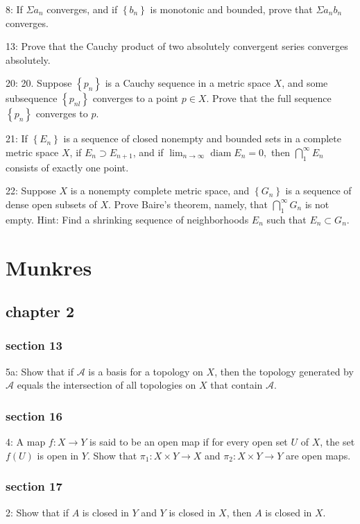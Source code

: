 \documentclass{article}
\begin{document}
8: If $\Sigma a_{n}$ converges, and if $\left\{b_{n}\right\}$ is monotonic and bounded, prove that $\Sigma a_{n} b_{n}$ converges.

13: Prove that the Cauchy product of two absolutely convergent series converges absolutely.

20: 20. Suppose $\left\{p_{n}\right\}$ is a Cauchy sequence in a metric space $X$, and some subsequence $\left\{p_{n l}\right\}$ converges to a point $p \in X$. Prove that the full sequence $\left\{p_{n}\right\}$ converges to $p$.

21: If $\left\{E_{n}\right\}$ is a sequence of closed nonempty and bounded sets in a complete metric space $X$, if $E_{n} \supset E_{n+1}$, and if $\lim _{n \rightarrow \infty} \operatorname{diam} E_{n}=0,$ then $\bigcap_{1}^{\infty} E_{n}$ consists of exactly one point.

22: Suppose $X$ is a nonempty complete metric space, and $\left\{G_{n}\right\}$ is a sequence of dense open subsets of $X$. Prove Baire's theorem, namely, that $\bigcap_{1}^{\infty} G_{n}$ is not empty. Hint: Find a shrinking sequence of neighborhoods $E_{n}$ such that $E_{n} \subset G_{n}$. 

\section*{Munkres}
\subsection*{chapter 2}
\subsubsection*{section 13}
5a: Show that if $\mathcal{A}$ is a basis for a topology on $X$, then the topology generated by $\mathcal{A}$ equals the intersection of all topologies on $X$ that contain $\mathcal{A}$. 

\subsubsection*{section 16}
4: A map $f: X \rightarrow Y$ is said to be an open map if for every open set $U$ of $X$, the set $f(U)$ is open in $Y$. Show that $\pi_{1}: X \times Y \rightarrow X$ and $\pi_{2}: X \times Y \rightarrow Y$ are open maps.

\subsubsection*{section 17}
2: Show that if $A$ is closed in $Y$ and $Y$ is closed in $X$, then $A$ is closed in $X$.
\end{document}
